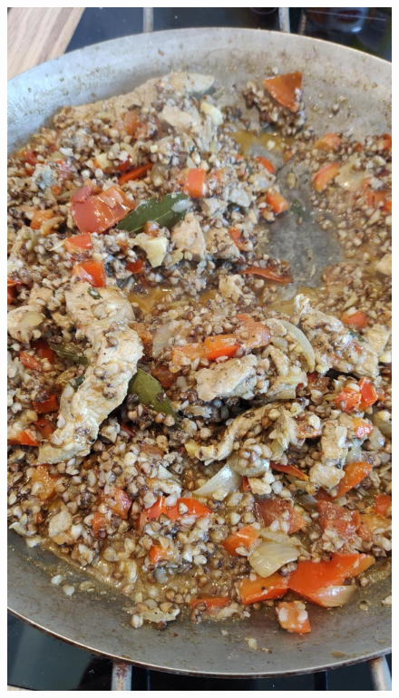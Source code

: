 \begin{figure}
    \centering
    \includegraphics[angle=90, width=.5\textwidth]{lasse/Buchweizenpfanne.jpeg}
\end{figure}
